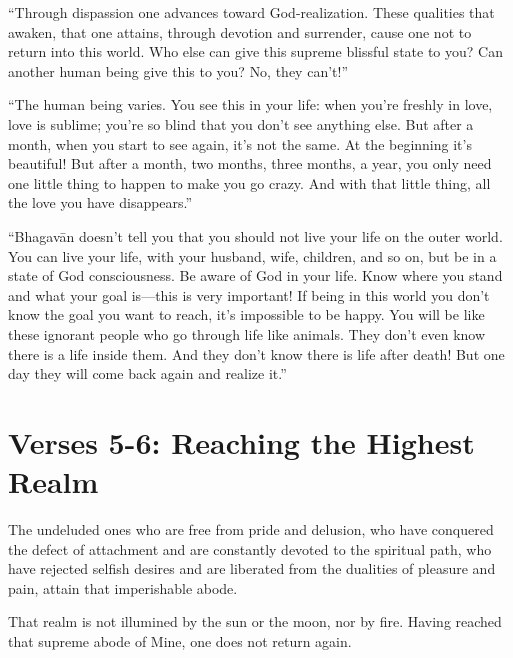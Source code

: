 \enquote{Through dispassion one advances toward God-realization. These qualities that awaken, that one attains, through devotion and surrender, cause one not to return into this world. Who else can give this supreme blissful state to you? Can another human being give this to you? No, they can’t!}

\enquote{The human being varies. You see this in your life: when you’re freshly in love, love is sublime; you’re so blind that you don’t see anything else. But after a month, when you start to see again, it’s not the same. At the beginning it’s beautiful! But after a month, two months, three months, a year, you only need one little thing to happen to make you go crazy. And with that little thing, all the love you have disappears.}

\enquote{Bhagavān doesn’t tell you that you should not live your life on the outer world. You can live your life, with your husband, wife, children, and so on, but be in a state of God consciousness. Be aware of God in your life. Know where you stand and what your goal is---this is very important! If being in this world you don’t know the goal you want to reach, it’s impossible to be happy. You will be like these ignorant people who go through life like animals. They don’t even know there is a life inside them. And they don’t know there is life after death! But one day they will come back again and realize it.}


\section{Verses 5-6: Reaching the Highest Realm}\label{sec-verses-5-6-reaching-the-highest-realm}

{The undeluded ones who are free from pride and delusion, who have conquered the defect of attachment and are constantly devoted to the spiritual path, who have rejected selfish desires and are liberated from the dualities of pleasure and pain, attain that imperishable abode.}

{That realm is not illumined by the sun or the moon, nor by fire. Having reached that supreme abode of Mine, one does not return again.}

